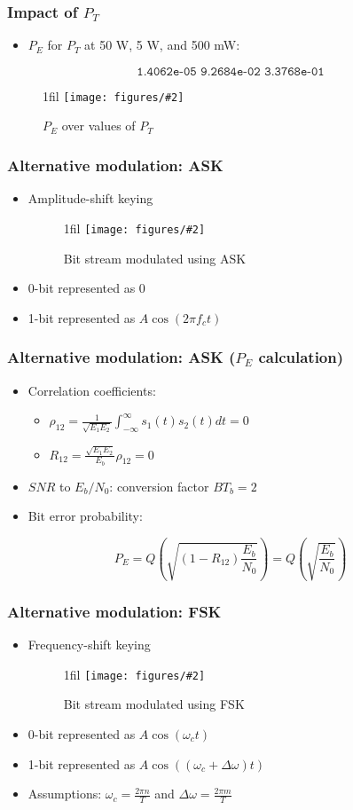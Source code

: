 \documentclass{beamer}
\makeatletter
\newcommand{\code}[1]{\texttt{#1}}
\newcommand*{\centerfloat}{%
  \parindent \z@
  \leftskip \z@ \@plus 1fil \@minus \textwidth
  \rightskip\leftskip
  \parfillskip \z@skip}
\newcommand{\fig}[3]{
  \begin{figure}[H]
  \centerfloat
    \texttt{[image: figures/\#2]}
    \caption{#3}
  \end{figure}
}
\makeatother
\begin{document}
\begin{frame}
	\frametitle{Impact of $P_T$}
	\begin{itemize}
		\item $P_E$ for $P_T$ at 50 W, 5 W, and 500 mW:
	\end{itemize}
	\begin{equation}
		\code{1.4062e-05   9.2684e-02   3.3768e-01}
	\end{equation}
	\fig{4cm}{pe_over_pt.png}{$P_E$ over values of $P_T$}
\end{frame}

\begin{frame}
	\frametitle{Alternative modulation: ASK}
	\begin{itemize}
		\item Amplitude-shift keying
		\fig{2.5cm}{ask.png}{Bit stream modulated using ASK}
		\item 0-bit represented as 0
		\item 1-bit represented as $A\cos(2 \pi f_c t)$
	\end{itemize}
\end{frame}

\begin{frame}
	\frametitle{Alternative modulation: ASK ($P_E$ calculation)}
	\begin{itemize}
		\item Correlation coefficients:
		\begin{itemize}
			\item $\rho_{12} = \frac{1}{\sqrt{E_1 E_2}} \int_{-\infty}^{\infty} s_1(t) s_2(t) dt = 0$
			\item $R_{12} = \frac{\sqrt{E_1 E_2}}{E_b}\rho_{12} = 0$
		\end{itemize}
		\item $SNR$ to $E_b/N_0$: conversion factor $B T_b = 2$
		\item Bit error probability:
	\end{itemize}
	\begin{equation}
		P_E = Q\left(\sqrt{\left(1 - R_{12}\right) \frac{E_b}{N_0}}\right) = Q\left(\sqrt{\frac{E_b}{N_0}}\right)
	\end{equation}
\end{frame}

\begin{frame}
	\frametitle{Alternative modulation: FSK}
	\begin{itemize}
		\item Frequency-shift keying
		\fig{2.5cm}{fsk.png}{Bit stream modulated using FSK}
		\item 0-bit represented as $A\cos(\omega_c t)$
		\item 1-bit represented as $A\cos((\omega_c + \Delta \omega) t)$
		\item Assumptions: $\omega_c = \frac{2 \pi n}{T}$ and $\Delta\omega = \frac{2 \pi m}{T}$
	\end{itemize}
\end{frame}
\end{document}
